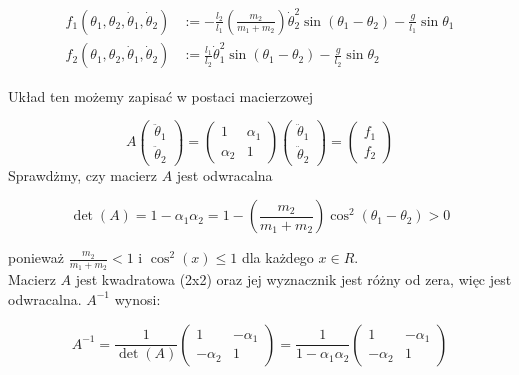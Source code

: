 \documentclass[]{article}
\begin{document}
	\begin{align*}
		f_1(\theta_1, \theta_2, \dot{\theta}_1, \dot{\theta}_2) &:= -\frac{l_2}{l_1} \left( \frac{m_2}{m_1 + m_2} \right) \dot{\theta}_2^2 \sin(\theta_1 - \theta_2) - \frac{g}{l_1} \sin \theta_1 \\
		f_2(\theta_1, \theta_2, \dot{\theta}_1, \dot{\theta}_2) &:= \frac{l_1}{l_2} \dot{\theta}_1^2 \sin(\theta_1 - \theta_2) - \frac{g}{l_2} \sin \theta_2
	\end{align*}
	
	Układ ten możemy zapisać w postaci macierzowej
	
	\begin{equation}
		A \begin{pmatrix}
			\ddot{\theta}_1 \\
			\ddot{\theta}_2
		\end{pmatrix}
		=
		\begin{pmatrix}
			1 & \alpha_1 \\
			\alpha_2 & 1
		\end{pmatrix}
		\begin{pmatrix}
			\ddot{\theta}_1 \\
			\ddot{\theta}_2
		\end{pmatrix}
		=
		\begin{pmatrix}
			f_1 \\
			f_2
		\end{pmatrix}
	\end{equation}
	Sprawdżmy, czy macierz \( A \) jest odwracalna
	
	\begin{equation}
		\det(A) = 1 - \alpha_1 \alpha_2 = 1 - \left( \frac{m_2}{m_1 + m_2} \right) \cos^2(\theta_1 - \theta_2) > 0
	\end{equation}
	
	ponieważ \( \frac{m_2}{m_1 + m_2} < 1 \) i \( \cos^2(x) \leq 1 \) dla każdego \( x \in R\).\\
	Macierz \( A \) jest kwadratowa (2x2) oraz jej wyznacznik jest różny od zera, więc jest odwracalna. \( A^{-1} \) wynosi: 

	
	
	\begin{equation}
		A^{-1} = \frac{1}{\det(A)}
		\begin{pmatrix}
			1 & -\alpha_1 \\
			-\alpha_2 & 1
		\end{pmatrix}
		= \frac{1}{1 - \alpha_1 \alpha_2}
		\begin{pmatrix}
			1 & -\alpha_1 \\
			-\alpha_2 & 1
		\end{pmatrix}
	\end{equation}
	
\end{document}
